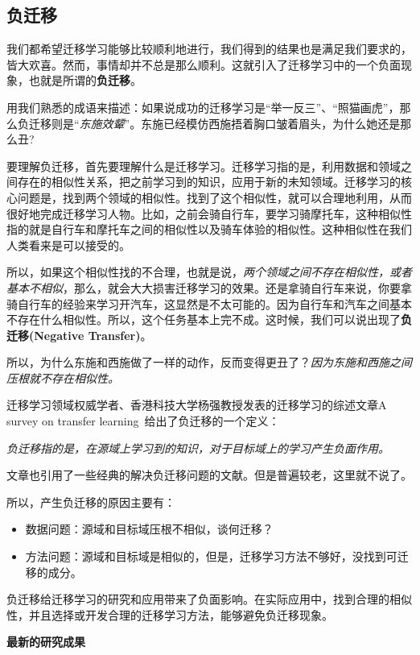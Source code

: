 \subsection{负迁移}
我们都希望迁移学习能够比较顺利地进行，我们得到的结果也是满足我们要求的，皆大欢喜。然而，事情却并不总是那么顺利。这就引入了迁移学习中的一个负面现象，也就是所谓的\textbf{负迁移}。

用我们熟悉的成语来描述：如果说成功的迁移学习是“举一反三”、“照猫画虎”，那么负迁移则是“\textit{东施效颦}”。东施已经模仿西施捂着胸口皱着眉头，为什么她还是那么丑?

要理解负迁移，首先要理解什么是迁移学习。迁移学习指的是，利用数据和领域之间存在的相似性关系，把之前学习到的知识，应用于新的未知领域。迁移学习的核心问题是，找到两个领域的相似性。找到了这个相似性，就可以合理地利用，从而很好地完成迁移学习人物。比如，之前会骑自行车，要学习骑摩托车，这种相似性指的就是自行车和摩托车之间的相似性以及骑车体验的相似性。这种相似性在我们人类看来是可以接受的。

所以，如果这个相似性找的不合理，也就是说，\textit{两个领域之间不存在相似性，或者基本不相似}，那么，就会大大损害迁移学习的效果。还是拿骑自行车来说，你要拿骑自行车的经验来学习开汽车，这显然是不太可能的。因为自行车和汽车之间基本不存在什么相似性。所以，这个任务基本上完不成。这时候，我们可以说出现了\textbf{负迁移(Negative Transfer)}。

所以，为什么东施和西施做了一样的动作，反而变得更丑了？\textit{因为东施和西施之间压根就不存在相似性。}

迁移学习领域权威学者、香港科技大学杨强教授发表的迁移学习的综述文章A survey on transfer learning~\cite{pan2010survey}给出了负迁移的一个定义：

\textit{负迁移指的是，在源域上学习到的知识，对于目标域上的学习产生负面作用。}

文章也引用了一些经典的解决负迁移问题的文献。但是普遍较老，这里就不说了。

所以，产生负迁移的原因主要有：

\begin{itemize}
	\item 数据问题：源域和目标域压根不相似，谈何迁移？
	\item 方法问题：源域和目标域是相似的，但是，迁移学习方法不够好，没找到可迁移的成分。
\end{itemize}

负迁移给迁移学习的研究和应用带来了负面影响。在实际应用中，找到合理的相似性，并且选择或开发合理的迁移学习方法，能够避免负迁移现象。

\textbf{最新的研究成果}

